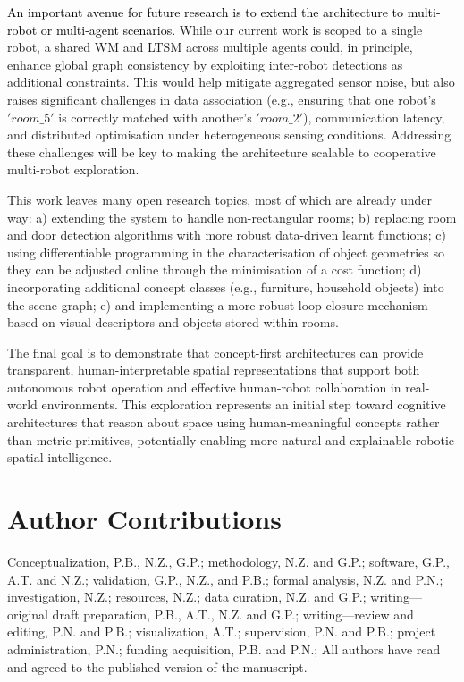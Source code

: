 \documentclass[10pt,a4paper]{article}
\begin{document}
\textcolor{black}{An important avenue for future research is to extend the architecture to multi-robot or multi-agent scenarios.} While our current work is scoped to a single robot, a shared WM and LTSM across multiple agents could, in principle, enhance global graph consistency by exploiting inter-robot detections as additional constraints. This would help mitigate aggregated sensor noise, but also raises significant challenges in data association (e.g., ensuring that one robot’s $'room\_5'$ is correctly matched with another’s $'room\_2'$), communication latency, and distributed optimisation under heterogeneous sensing conditions. Addressing these challenges will be key to making the architecture scalable to cooperative multi-robot exploration.

This work leaves many open research topics, most of which are already under way: a) extending the system to handle non-rectangular rooms; b) replacing room and door detection algorithms with more robust data-driven learnt functions; c) using differentiable programming in the characterisation of object geometries so they can be adjusted online through the minimisation of a cost function; d) incorporating additional concept classes (e.g., furniture, household objects) into the scene graph; e) and implementing a more robust loop closure mechanism based on visual descriptors and objects stored within rooms.

%

The final goal is to demonstrate that concept-first architectures can provide transparent, human-interpretable spatial representations that support both autonomous robot operation and effective human-robot collaboration in real-world environments. This exploration represents an initial step toward cognitive architectures that reason about space using human-meaningful concepts rather than metric primitives, potentially enabling more natural and explainable robotic spatial intelligence.

\vspace{6pt} 

\section*{Author Contributions}
Conceptualization, P.B., N.Z., G.P.; methodology, N.Z. and G.P.; software, G.P., A.T. and N.Z.; validation, G.P., N.Z., and P.B.; formal analysis, N.Z. and P.N.; investigation, N.Z.; resources, N.Z.; data curation, N.Z. and G.P.; writing---original draft preparation, P.B., A.T., N.Z. and G.P.; writing---review and editing, P.N. and P.B.; visualization, A.T.; supervision, P.N. and P.B.; project administration, P.N.; funding acquisition, P.B. and P.N.; All authors have read and agreed to the published version of the manuscript.
\end{document}
